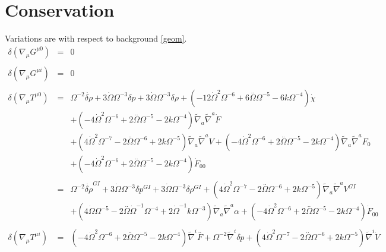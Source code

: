\documentclass[10pt,letterpaper]{article}
\numberwithin{equation}{section}
\begin{document}
\section{Conservation}
Variations are with respect to background \eqref{geom}.
\begin{eqnarray}
\delta(\nabla_\mu G^{\mu 0})&=& 0
\\  \nonumber\\ 
\delta(\nabla_\mu G^{\mu i})&=& 0
\\ \nonumber\\
\delta(\nabla_\mu T^{\mu 0})&=& \Omega^{-2} \dot{\delta \rho} + 3 \dot{\Omega} \Omega^{-3} \delta p + 3 \dot{\Omega} \Omega^{-3} \delta \rho + (-12 \dot{\Omega}^2 \Omega^{-6} + 6 \overset{..}{\Omega} \Omega^{-5} - 6 k \Omega^{-4}) \dot{\chi} \nonumber \\ 
&& + (-4 \dot{\Omega}^2 \Omega^{-6} + 2 \overset{..}{\Omega} \Omega^{-5} - 2 k \Omega^{-4}) \tilde{\nabla}_{a}\tilde{\nabla}^{a}\dot{F} \nonumber \\ 
&& + (4 \dot{\Omega}^2 \Omega^{-7} - 2 \overset{..}{\Omega} \Omega^{-6} + 2 k \Omega^{-5}) \tilde{\nabla}_{a}\tilde{\nabla}^{a}V+(-4 \dot{\Omega}^2 \Omega^{-6} + 2 \overset{..}{\Omega} \Omega^{-5} - 2 k \Omega^{-4}) \tilde{\nabla}_{a}\tilde{\nabla}^{a}F_{0}{} \nonumber\\
&&+(-4 \dot{\Omega}^2 \Omega^{-6} + 2 \overset{..}{\Omega} \Omega^{-5} - 2 k \Omega^{-4}) \dot{F}_{00}{}
 \\ \nonumber\\
&=& \Omega^{-2} \dot{\delta \rho}^{GI}{} + 3 \dot{\Omega} \Omega^{-3} \delta p^{GI}{} + 3 \dot{\Omega} \Omega^{-3} \delta \rho^{GI}{} + (4 \dot{\Omega}^2 \Omega^{-7} - 2 \overset{..}{\Omega} \Omega^{-6} + 2 k \Omega^{-5}) \tilde{\nabla}_{a}\tilde{\nabla}^{a}V^{GI}{} \nonumber \\ 
&& + (4 \dot{\Omega} \Omega^{-5} - 2 \overset{..}{\Omega} \dot{\Omega}^{-1} \Omega^{-4} + 2 \dot{\Omega}^{-1} k \Omega^{-3}) \tilde{\nabla}_{a}\tilde{\nabla}^{a}\alpha +(-4 \dot{\Omega}^2 \Omega^{-6} + 2 \overset{..}{\Omega} \Omega^{-5} - 2 k \Omega^{-4}) \dot{F}_{00}{}
\\  \nonumber\\ 
\delta(\nabla_\mu T^{\mu i})&=& (-4 \dot{\Omega}^2 \Omega^{-6} + 2 \overset{..}{\Omega} \Omega^{-5} - 2 k \Omega^{-4}) \tilde{\nabla}^{i}\overset{..}{F} + \Omega^{-2} \tilde{\nabla}^{i}\delta p + (4 \dot{\Omega}^2 \Omega^{-7} - 2 \overset{..}{\Omega} \Omega^{-6} + 2 k \Omega^{-5}) \tilde{\nabla}^{i}\dot{V} \nonumber \\ 

\end{eqnarray}
\end{document}
